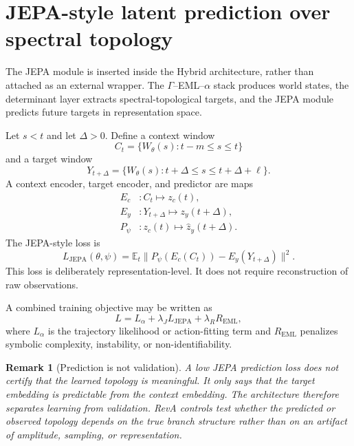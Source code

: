 \documentclass[11pt]{article}
\newtheorem{remark}{Remark}
\begin{document}
\section{JEPA-style latent prediction over spectral topology}
The JEPA module is inserted inside the Hybrid architecture, rather than attached as an external wrapper. The $\Gamma$--EML--$\alpha$ stack produces world states, the determinant layer extracts spectral-topological targets, and the JEPA module predicts future targets in representation space.

Let $s<t$ and let $\Delta>0$. Define a context window
\begin{equation}
C_t=\{W_\theta(s):t-m\le s\le t\}
\end{equation}
and a target window
\begin{equation}
Y_{t+\Delta}=\{W_\theta(s):t+\Delta\le s\le t+\Delta+\ell\}.
\end{equation}
A context encoder, target encoder, and predictor are maps
\begin{align}
E_c&:C_t\mapsto z_c(t),\\
E_y&:Y_{t+\Delta}\mapsto z_y(t+\Delta),\\
P_\psi&:z_c(t)\mapsto \widehat z_y(t+\Delta).
\end{align}
The JEPA-style loss is
\begin{equation}
L_{\mathrm{JEPA}}(\theta,\psi)=\mathbb{E}_t\|P_\psi(E_c(C_t))-E_y(Y_{t+\Delta})\|^2.
\end{equation}
This loss is deliberately representation-level. It does not require reconstruction of raw observations.

A combined training objective may be written as
\begin{equation}
L=L_\alpha+\lambda_J L_{\mathrm{JEPA}}+\lambda_R R_{\mathrm{EML}},
\end{equation}
where $L_\alpha$ is the trajectory likelihood or action-fitting term and $R_{\mathrm{EML}}$ penalizes symbolic complexity, instability, or non-identifiability.

\begin{remark}[Prediction is not validation]
A low JEPA prediction loss does not certify that the learned topology is meaningful. It only says that the target embedding is predictable from the context embedding. The architecture therefore separates learning from validation. RevA controls test whether the predicted or observed topology depends on the true branch structure rather than on an artifact of amplitude, sampling, or representation.
\end{remark}
\end{document}
